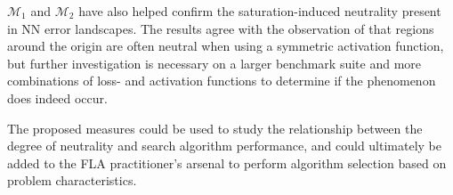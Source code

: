 \documentclass[conference]{IEEEtran}
\begin{document}
${\mathcal{M}_1}$ and ${\mathcal{M}_2}$ have also helped confirm the saturation-induced neutrality present in NN error landscapes. The results agree with the observation of \citet{lecun2012efficient} that regions around the origin are often neutral when using a symmetric activation function, but further investigation is necessary on a larger benchmark suite and more combinations of loss- and activation functions to determine if the phenomenon does indeed occur.

The proposed measures could be used to study the relationship between the degree of neutrality and search algorithm performance, and could ultimately be added to the FLA practitioner's arsenal to perform algorithm selection based on problem characteristics.

%
%



%
%
\end{document}
